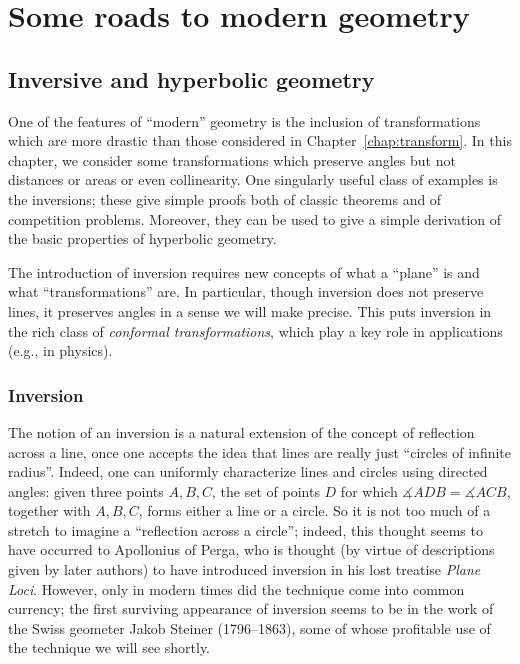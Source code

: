 \documentclass[12pt]{book}
\numberwithin{exc}{section}
\numberwithin{figure}{section}
\numberwithin{equation}{theorem}
\def\dang{\measuredangle} %
\begin{document}
\part{Some roads to modern geometry}

\chapter{Inversive and hyperbolic geometry}
\label{chap:inversion}

One of the features of ``modern'' geometry is the inclusion of
transformations which are more drastic than those considered in
Chapter~\ref{chap:transform}. In this chapter, we consider some
transformations which preserve angles but not distances or areas
or even collinearity.
One singularly useful class of examples is the inversions; these give
simple proofs both of classic theorems and of competition problems.
Moreover, they can be used to give a simple derivation of the basic properties
of hyperbolic geometry.

The introduction of inversion requires new concepts of what a ``plane''
is and what ``transformations'' are. In particular, though inversion
does not preserve lines, it preserves angles in a sense we will make precise.
This puts inversion in the rich class of \emph{conformal transformations},
which play a key role in applications (e.g., in physics).

\section{Inversion}

The notion of an inversion is a natural extension of the concept of reflection
across a line, once one accepts the idea that lines are really just
``circles of infinite radius''. Indeed, one can uniformly characterize lines
and circles using directed angles: given three points $A,B,C$, the set of
points $D$ for which $\dang ADB = \dang ACB$, together with $A,B,C$, forms
either a line or a circle. So it is not too much of a stretch to imagine
a ``reflection across a circle''; indeed, this thought seems to have
occurred to Apollonius of Perga,  who is 
thought (by virtue of descriptions given by later authors)
to have introduced inversion in his lost treatise \emph{Plane Loci}.
However, only in modern times did the technique come into common currency;
the first surviving appearance of inversion seems to be in the work of
the Swiss geometer Jakob Steiner (1796--1863), 
some of whose profitable use of the technique we will see shortly.
\end{document}

